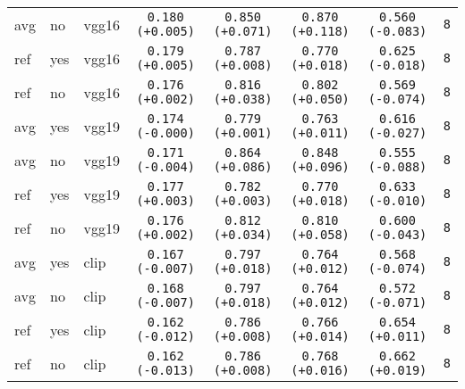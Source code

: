 \begin{tabular}{|l|l|l|c|c|c|c|c|}
avg & no & vgg16 & \texttt{0.180 {\color{green}(+0.005)}} & \texttt{0.850 {\color{red}(+0.071)}} & \texttt{0.870 {\color{red}(+0.118)}} & \texttt{0.560 {\color{red}(-0.083)}} & \texttt{8} \\
ref & yes & vgg16 & \texttt{0.179 {\color{green}(+0.005)}} & \texttt{0.787 {\color{red}(+0.008)}} & \texttt{0.770 {\color{red}(+0.018)}} & \texttt{0.625 {\color{red}(-0.018)}} & \texttt{8} \\
ref & no & vgg16 & \texttt{0.176 {\color{green}(+0.002)}} & \texttt{0.816 {\color{red}(+0.038)}} & \texttt{0.802 {\color{red}(+0.050)}} & \texttt{0.569 {\color{red}(-0.074)}} & \texttt{8} \\
\hline
avg & yes & vgg19 & \texttt{0.174 {\color{black}(-0.000)}} & \texttt{0.779 {\color{red}(+0.001)}} & \texttt{0.763 {\color{red}(+0.011)}} & \texttt{0.616 {\color{red}(-0.027)}} & \texttt{8} \\
avg & no & vgg19 & \texttt{0.171 {\color{red}(-0.004)}} & \texttt{0.864 {\color{red}(+0.086)}} & \texttt{0.848 {\color{red}(+0.096)}} & \texttt{0.555 {\color{red}(-0.088)}} & \texttt{8} \\
ref & yes & vgg19 & \texttt{0.177 {\color{green}(+0.003)}} & \texttt{0.782 {\color{red}(+0.003)}} & \texttt{0.770 {\color{red}(+0.018)}} & \texttt{0.633 {\color{red}(-0.010)}} & \texttt{8} \\
ref & no & vgg19 & \texttt{0.176 {\color{green}(+0.002)}} & \texttt{0.812 {\color{red}(+0.034)}} & \texttt{0.810 {\color{red}(+0.058)}} & \texttt{0.600 {\color{red}(-0.043)}} & \texttt{8} \\
\hline
avg & yes & clip & \texttt{0.167 {\color{red}(-0.007)}} & \texttt{0.797 {\color{red}(+0.018)}} & \texttt{0.764 {\color{red}(+0.012)}} & \texttt{0.568 {\color{red}(-0.074)}} & \texttt{8} \\
avg & no & clip & \texttt{0.168 {\color{red}(-0.007)}} & \texttt{0.797 {\color{red}(+0.018)}} & \texttt{0.764 {\color{red}(+0.012)}} & \texttt{0.572 {\color{red}(-0.071)}} & \texttt{8} \\
ref & yes & clip & \texttt{0.162 {\color{red}(-0.012)}} & \texttt{0.786 {\color{red}(+0.008)}} & \texttt{0.766 {\color{red}(+0.014)}} & \texttt{0.654 {\color{green}(+0.011)}} & \texttt{8} \\
ref & no & clip & \texttt{0.162 {\color{red}(-0.013)}} & \texttt{0.786 {\color{red}(+0.008)}} & \texttt{0.768 {\color{red}(+0.016)}} & \texttt{0.662 {\color{green}(+0.019)}} & \texttt{8} \\
\hline
\end{tabular}
